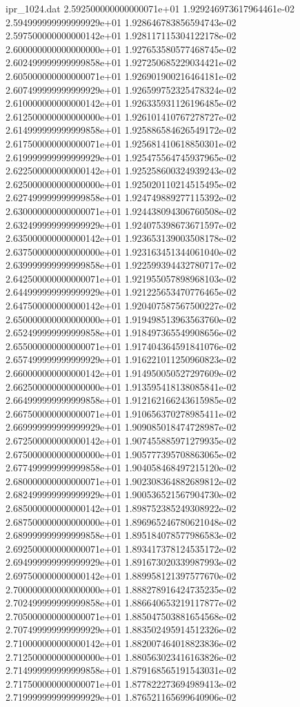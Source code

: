 \begin{filecontents}{ipr_1024.dat}
2.592500000000000071e+01 1.929246973617964461e-02
2.594999999999999929e+01 1.928646783856594743e-02
2.597500000000000142e+01 1.928117115304122178e-02
2.600000000000000000e+01 1.927653580577468745e-02
2.602499999999999858e+01 1.927250685229034421e-02
2.605000000000000071e+01 1.926901900216464181e-02
2.607499999999999929e+01 1.926599752325478324e-02
2.610000000000000142e+01 1.926335931126196485e-02
2.612500000000000000e+01 1.926101410767278727e-02
2.614999999999999858e+01 1.925886584626549172e-02
2.617500000000000071e+01 1.925681410618850301e-02
2.619999999999999929e+01 1.925475564745937965e-02
2.622500000000000142e+01 1.925258600324939243e-02
2.625000000000000000e+01 1.925020110214515495e-02
2.627499999999999858e+01 1.924749889277115392e-02
2.630000000000000071e+01 1.924438094306760508e-02
2.632499999999999929e+01 1.924075398673671597e-02
2.635000000000000142e+01 1.923653139003508178e-02
2.637500000000000000e+01 1.923163451344061040e-02
2.639999999999999858e+01 1.922599394432780717e-02
2.642500000000000071e+01 1.921955057898968103e-02
2.644999999999999929e+01 1.921225653470776465e-02
2.647500000000000142e+01 1.920407587567500227e-02
2.650000000000000000e+01 1.919498513963563760e-02
2.652499999999999858e+01 1.918497365549908656e-02
2.655000000000000071e+01 1.917404364591841076e-02
2.657499999999999929e+01 1.916221011250960823e-02
2.660000000000000142e+01 1.914950050527297609e-02
2.662500000000000000e+01 1.913595418138085841e-02
2.664999999999999858e+01 1.912162166243615985e-02
2.667500000000000071e+01 1.910656370278985411e-02
2.669999999999999929e+01 1.909085018474728987e-02
2.672500000000000142e+01 1.907455885971279935e-02
2.675000000000000000e+01 1.905777395708863065e-02
2.677499999999999858e+01 1.904058468497215120e-02
2.680000000000000071e+01 1.902308364882689812e-02
2.682499999999999929e+01 1.900536521567904730e-02
2.685000000000000142e+01 1.898752385249308922e-02
2.687500000000000000e+01 1.896965246780621048e-02
2.689999999999999858e+01 1.895184078577986583e-02
2.692500000000000071e+01 1.893417378124535172e-02
2.694999999999999929e+01 1.891673020339987993e-02
2.697500000000000142e+01 1.889958121397577670e-02
2.700000000000000000e+01 1.888278916424735235e-02
2.702499999999999858e+01 1.886640653219117877e-02
2.705000000000000071e+01 1.885047503881654568e-02
2.707499999999999929e+01 1.883502495914512326e-02
2.710000000000000142e+01 1.882007464018823836e-02
2.712500000000000000e+01 1.880563023416163826e-02
2.714999999999999858e+01 1.879168565191543031e-02
2.717500000000000071e+01 1.877822273694989413e-02
2.719999999999999929e+01 1.876521165699640906e-02

\end{filecontents}
